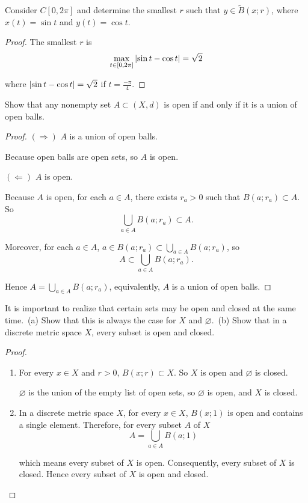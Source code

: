 \begin{exercise}\label{chapter1:section3:exercise3}
    Consider $C[0, 2\pi]$ and determine the smallest $r$ such that $y\in \widetilde{B}(x; r)$, where $x(t) = \sin t$ and $y(t) = \cos t$.
\end{exercise}

\begin{proof}
    The smallest $r$ is
    \[
        \max_{t\in [0,2\pi]}\left\vert{\sin t - \cos t}\right\vert = \sqrt{2}
    \]

    where $\left\vert{\sin t - \cos t}\right\vert = \sqrt{2}$ if $t = \frac{-\pi}{4}$.
\end{proof}

\begin{exercise}\label{chapter1:section3:exercise4}
    Show that any nonempty set $A\subset (X, d)$ is open if and only if it is a union of open balls.
\end{exercise}

\begin{proof}
    $(\Rightarrow)$ $A$ is a union of open balls.

    Because open balls are open sets, so $A$ is open.

    $(\Leftarrow)$ $A$ is open.

    Because $A$ is open, for each $a\in A$, there exists $r_{a} > 0$ such that $B(a; r_{a})\subset A$. So
    \[
        \bigcup_{a\in A}B(a; r_{a})\subset A.
    \]

    Moreover, for each $a\in A$, $a\in B(a; r_{a})\subset \bigcup_{a\in A}B(a; r_{a})$, so
    \[
        A\subset \bigcup_{a\in A}B(a; r_{a}).
    \]

    Hence $A = \bigcup_{a\in A}B(a; r_{a})$, equivalently, $A$ is a union of open balls.
\end{proof}

\begin{exercise}\label{chapter1:section3:exercise5}
    It is important to realize that certain sets may be open and closed at the same time.\ (a) Show that this is always the case for $X$ and $\varnothing$.\ (b) Show that in a discrete metric space $X$, every subset is open and closed.
\end{exercise}

\begin{proof}
    \begin{enumerate}[label={(\alph*)}]
        \item For every $x\in X$ and $r > 0$, $B(x; r)\subset X$. So $X$ is open and $\varnothing$ is closed.

              $\varnothing$ is the union of the empty list of open sets, so $\varnothing$ is open, and $X$ is closed.
        \item In a discrete metric space $X$, for every $x\in X$, $B(x; 1)$ is open and contains a single element. Therefore, for every subset $A$ of $X$
              \[
                  A = \bigcup_{a\in A}B(a; 1)
              \]

              which means every subset of $X$ is open. Consequently, every subset of $X$ is closed. Hence every subset of $X$ is open and closed.
    \end{enumerate}
\end{proof}

